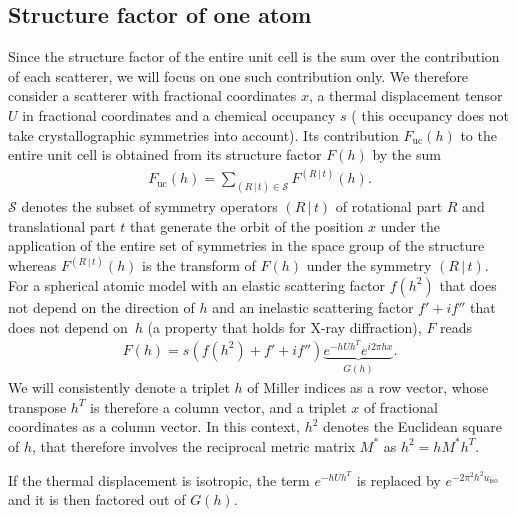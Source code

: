 \documentclass[11pt]{article}
\newcommand{\sym}[2]{\left( #1\,\vert\, #2 \right)}
\newcommand{\uiso}{u_{\text{iso}}}
\begin{document}
\subsection{Structure factor of one atom}

\newcommand{\Fuc}{F_{\text{uc}}}

Since the structure factor of the entire unit cell is the sum over the contribution of each scatterer, we will focus on one such contribution only. We therefore consider a scatterer with  fractional coordinates $x$, a thermal displacement tensor $U$ in fractional coordinates and a chemical occupancy $s$ ( this occupancy does not take crystallographic symmetries into account).  Its contribution $\Fuc(h)$ to the entire unit cell is obtained from its  structure factor $F(h)$  by the sum
\begin{align}
\Fuc(h) = \sum_{\sym{R}{t} \in \mathcal{S}} F^{\sym{R}{t}}(h).
\end{align}
$\mathcal{S}$ denotes the subset of symmetry operators $\sym{R}{t}$ of rotational part $R$ and translational part $t$ that generate the orbit of the position $x$ under the application of the entire set of symmetries in the space group of the structure whereas $F^{\sym{R}{t}}(h)$ is the transform of $F(h)$ under the symmetry $\sym{R}{t}$. For a spherical atomic model with an elastic scattering factor $f(h^2)$ that does not depend on the direction of $h$ and an inelastic scattering factor $f' + if''$ that does not depend on~$h$ (a property that holds for X-ray diffraction), $F$ reads
\begin{align}
F(h) = s (f(h^2) + f' + i f'') \underbrace{e^{-h U h^T} e^{i 2\pi h x}}_{G(h)}.
\label{eqn:anomalous:structure:factor}
\end{align}
We will consistently denote a triplet $h$ of Miller indices as a row vector, whose transpose $h^T$ is therefore a column vector, and a triplet $x$ of fractional coordinates as a column vector. In this context, $h^2$ denotes the Euclidean square of $h$, that therefore involves the reciprocal metric matrix $M^*$ as $h^2 = h M^* h^T$.

If the thermal displacement is isotropic, the term $e^{-h U h^T}$ is replaced by $e^{-2\pi^2 h^2 \uiso}$ and it is then factored out of $G(h)$.
\end{document}
